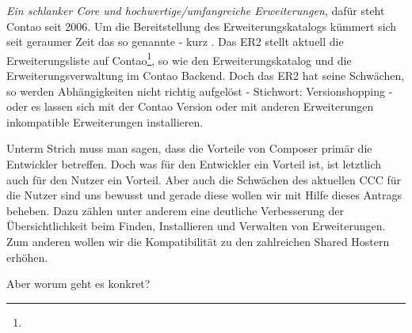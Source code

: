 \documentclass[
paper=a4,
draft=false,%
fontsize=10pt%
]{scrartcl}
\begin{document}
\addtocounter{footnote}{-1}

\textit{Ein schlanker Core und hochwertige/umfangreiche Erweiterungen}, dafür steht Contao seit 2006. Um die Bereitstellung des Erweiterungskatalogs kümmert sich seit geraumer Zeit das so genannte  - kurz . Das ER2 stellt aktuell die Erweiterungsliste auf Contao\footnote{}, so wie den Erweiterungskatalog und die Erweiterungsverwaltung im Contao Backend. Doch das ER2 hat seine Schwächen, so werden Abhängigkeiten nicht richtig aufgelöst - Stichwort: Versionshopping - oder es lassen sich mit der Contao Version oder mit anderen Erweiterungen inkompatible Erweiterungen installieren.

Unterm Strich muss man sagen, dass die Vorteile von Composer primär die Entwickler betreffen. Doch was für den Entwickler ein Vorteil ist, ist letztlich auch für den Nutzer ein Vorteil. Aber auch die Schwächen des aktuellen CCC für die Nutzer sind uns bewusst und gerade diese wollen wir mit Hilfe dieses Antrags beheben. Dazu zählen unter anderem eine deutliche Verbesserung der Übersichtlichkeit beim Finden, Installieren und Verwalten von Erweiterungen. Zum anderen wollen wir die Kompatibilität zu den zahlreichen Shared Hostern erhöhen.

Aber worum geht es konkret?
\end{document}
